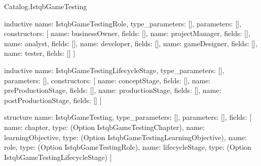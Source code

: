 \begin{lexlean}{Catalog.IstqbGameTesting}
\begin{semanticmodule}
inductive{
  name: IstqbGameTestingRole,
  type_parameters: [],
  parameters: [],
  constructors: [
    {name: businessOwner, fields: []},
    {name: projectManager, fields: []},
    {name: analyst, fields: []},
    {name: developer, fields: []},
    {name: gameDesigner, fields: []},
    {name: tester, fields: []}
  ]
}

inductive{
  name: IstqbGameTestingLifecycleStage,
  type_parameters: [],
  parameters: [],
  constructors: [
    {name: conceptStage, fields: []},
    {name: preProductionStage, fields: []},
    {name: productionStage, fields: []},
    {name: postProductionStage, fields: []}
  ]
}

structure{
  name: IstqbGameTesting,
  type_parameters: [],
  parameters: [],
  fields: [
    {name: chapter, type: (Option IstqbGameTestingChapter)},
    {name: learningObjective, type: (Option IstqbGameTestingLearningObjective)},
    {name: role, type: (Option IstqbGameTestingRole)},
    {name: lifecycleStage, type: (Option IstqbGameTestingLifecycleStage)}
  ]
}
\end{semanticmodule}
\end{lexlean}
